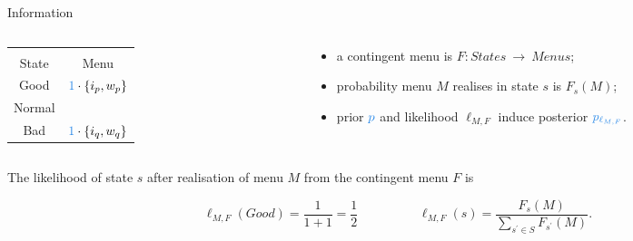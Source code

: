 \documentclass[usenames,dvipsnames,aspectratio=169,11pt, envcountsect, handout]{beamer}
\begin{document}
\begin{frame}[noframenumbering]{Information}
	\begin{columns}
		\begin{column}{0.35\textwidth} %
			\begin{center}
				\begin{table}
					\centering
					\begin{tabular}{c | c}
						\multicolumn{2}{c}{}                                                                \\
						State  & Menu                                                                       \\
						\hline
						Good   & \multirow{2}{*}{\( \textcolor{blue}{1} \cdot \left\{ i_p, w_p \right\} \)} \\
						Normal &                                                                            \\
						Bad    & \(\textcolor{blue}{1} \cdot \left\{ i_q, w_q \right\} \)                   \\
					\end{tabular}
				\end{table}
			\end{center}
		\end{column}

		\begin{column}{0.65\textwidth} %
			\begin{itemize}
				\item a contingent menu is \(F: States \: \rightarrow \: Menus \);
				\item probability menu \( M \) realises in state \( s \) is \( F_s \left( M \right) \);
				\item prior \( \textcolor{blue}{p} \) and likelihood \( \ell_{M,F} \) induce posterior \( \textcolor{blue}{p_{\ell_{M,F}}} \).
			\end{itemize}
		\end{column}
	\end{columns}

	\vspace{0.6cm}

	The likelihood of state \(s\) after realisation of menu \(M\) from the contingent menu \(F\) is

	\vfill

	\[ \ell_{M, F} \left( Good \right) = \frac{1}{1+1} = \frac{1}{2} \hspace{2cm} \ell_{M, F} \left( s \right) = \frac{F_{s} \left( M \right)}{ \sum_{s^{\prime} \in S} F_{s^{\prime}} \left( M \right)} .
	\]

\end{frame}
\end{document}
